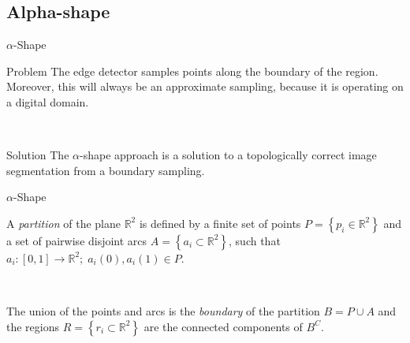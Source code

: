 
    \subsection{Alpha-shape}
    \begin{frame}{$\alpha$-Shape}
         {
            \begin{alertblock}{Problem}
                The edge detector samples points along the boundary of the region. Moreover, this will always be an approximate sampling, because it is operating on a digital domain.
            \end{alertblock}
        }
         {
            \begin{exampleblock}{Solution}
                The $\alpha$-shape approach is a solution to a topologically correct image segmentation from a boundary sampling.
            \end{exampleblock}
        }
    \end{frame}
    \begin{frame}{$\alpha$-Shape}
         {
            \begin{definition}
                A \textit{partition} of the plane $\mathbb{R}^2$ is defined by a finite set of points $P = \left\{p_i\in\mathbb{R}^2\right\}$ and a set of pairwise disjoint arcs $A = \left\{a_i \subset \mathbb{R}^2\right\}$, such that $a_i\colon \left[0,1\right] \rightarrow \mathbb{R}^2;\; a_i(0), a_i(1) \in P$.
            \end{definition}
        }
         {
            \begin{definition}
                The union of the points and arcs is the \textit{boundary} of the partition $B = P \cup A$ and the regions $R = \left\{r_i \subset \mathbb{R}^2\right\}$ are the connected components of $B^C$.
            \end{definition}
        }
    \end{frame}
